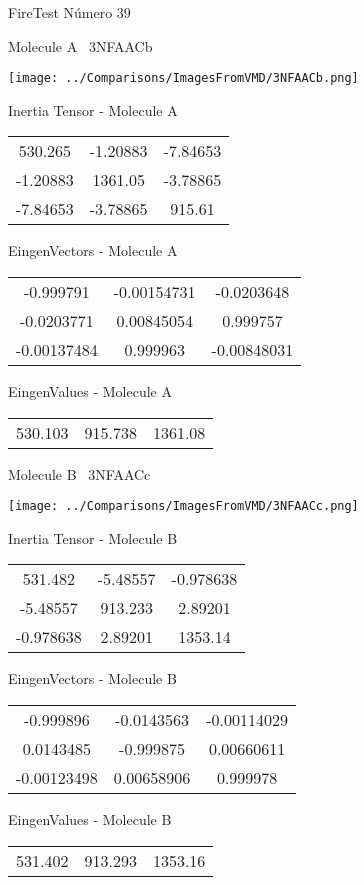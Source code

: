 \vtab[-3cm]
\begin{center}
{\large FireTest \tab Número 39}
\end{center}
\begin{multicols}{2}
\begin{center}

Molecule A \
3NFAACb

\texttt{[image: ../Comparisons/ImagesFromVMD/3NFAACb.png]}

Inertia Tensor - Molecule A \\
\begin{tabular}{|c c c|}
530.265	 & 	-1.20883	 & 	-7.84653	 \\
-1.20883	 & 	1361.05	 & 	-3.78865	 \\
-7.84653	 & 	-3.78865	 & 	915.61
\end{tabular}

\vtab
 EingenVectors - Molecule A     \\
\begin{tabular}{|c c c|}
-0.999791	 & 	-0.00154731	 & 	-0.0203648	 \\
-0.0203771	 & 	0.00845054	 & 	0.999757	 \\
-0.00137484	 & 	0.999963	 & 	-0.00848031
\end{tabular}

\vtab
 EingenValues - Molecule A     \\
\begin{tabular}{|c c c|}
530.103	 & 	915.738	 & 	1361.08	 \\
\end{tabular}
\columnbreak

Molecule B \
3NFAACc

\texttt{[image: ../Comparisons/ImagesFromVMD/3NFAACc.png]}

Inertia Tensor - Molecule B \\
\begin{tabular}{|c c c|}
531.482	 & 	-5.48557	 & 	-0.978638	 \\
-5.48557	 & 	913.233	 & 	2.89201	 \\
-0.978638	 & 	2.89201	 & 	1353.14
\end{tabular}

\vtab
 EingenVectors - Molecule B     \\
\begin{tabular}{|c c c|}
-0.999896	 & 	-0.0143563	 & 	-0.00114029	 \\
0.0143485	 & 	-0.999875	 & 	0.00660611	 \\
-0.00123498	 & 	0.00658906	 & 	0.999978
\end{tabular}

\vtab
 EingenValues - Molecule B     \\
\begin{tabular}{|c c c|}
531.402	 & 	913.293	 & 	1353.16	 \\
\end{tabular}

\end{center}
\end{multicols}

